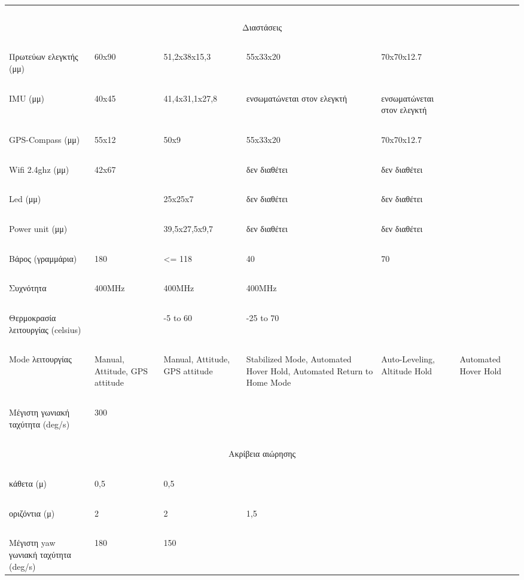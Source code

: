 \documentclass[a4paper, 12pt, twoside]{report}
\begin{document}
{{{{{{\begin{landscape}
\begin{longtable} { m{3cm} m{3cm} m{3cm} m{3cm} m{3cm} m{3cm} }
					\hdashline
					~\\
					\multicolumn{6}{c}{Διαστάσεις}\\
					\hdashline
					~\\
					Πρωτεύων ελεγκτής (μμ) & 60x90 & 51,2x38x15,3 & 55x33x20 & 70x70x12.7 & \\
					~\\
					IMU (μμ) & 40x45 & 41,4x31,1x27,8 & ενσωματώνεται στον ελεγκτή & ενσωματώνεται στον ελεγκτή & \\
					~\\
					GPS-Compass (μμ) & 55x12 & 50x9 & 55x33x20 & 70x70x12.7 & \\
					~\\
					Wifi 2.4ghz (μμ) & 42x67 & & δεν διαθέτει & δεν διαθέτει & \\
					~\\
					Led (μμ) & & 25x25x7 & δεν διαθέτει & δεν διαθέτει & \\
					~\\
					Power unit (μμ) & & 39,5x27,5x9,7 & δεν διαθέτει & δεν διαθέτει & \\
					\hdashline
					~\\
					Βάρος (γραμμάρια) & 180 & <= 118 & 40 & 70 & \\
					\hdashline
					~\\
					Συχνότητα & 400MHz & 400MHz & 400MHz & & \\
					\hdashline
					~\\
					Θερμοκρασία λειτουργίας (celsius) & & -5 to 60 & -25 to 70 & & \\
					\hdashline
					~\\
					Mode λειτουργίας & Manual, Attitude, GPS attitude & Manual, Attitude, GPS attitude & Stabilized Mode, Automated Hover Hold, Automated Return to Home Mode & Auto-Leveling, Altitude Hold & Automated Hover Hold\\
					\hdashline
					~\\
					Μέγιστη γωνιακή ταχύτητα (deg/s) & 300  & & & & \\
					\hdashline
					~\\
					\multicolumn{6}{c}{Ακρίβεια αιώρησης}\\
					~\\
					κάθετα (μ) & 0,5 & 0,5 & & & \\
					~\\
					οριζόντια (μ) & 2 & 2 & 1,5 & & \\
					\hdashline
					~\\
					Μέγιστη yaw γωνιακή ταχύτητα (deg/s) & 180 & 150  & & & \\

\end{longtable}
\end{landscape}}}}}}}
\end{document}
